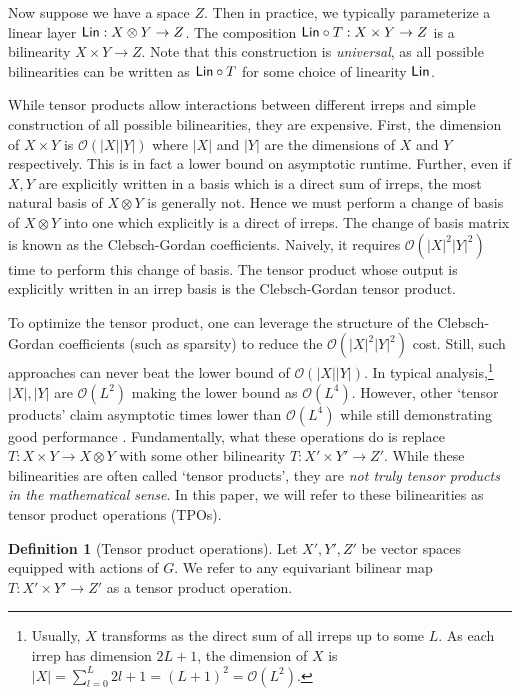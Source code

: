 \documentclass{article}
\theoremstyle{definition}
\newtheorem{definition}[theorem]{Definition}
\theoremstyle{remark}
\begin{document}
Now suppose we have a space $Z$. Then in practice, we typically parameterize a linear layer $\mathsf{Lin} :X\otimes Y\to Z$. The composition $\mathsf{Lin} \circ T:X\times Y\to Z$ is a bilinearity $X\times Y\to Z$. Note that this construction is \emph{universal}, as all possible bilinearities can be written as $\mathsf{Lin} \circ T$ for some choice of linearity $\mathsf{Lin}$.

While tensor products allow interactions between different irreps and simple construction of all possible bilinearities, they are expensive. First, the dimension of $X\times Y$ is $\mathcal{O}(|X||Y|)$ where $|X|$ and $|Y|$ are the dimensions of $X$ and $Y$ respectively. This is in fact a lower bound on asymptotic runtime. Further, even if $X,Y$ are explicitly written in a basis which is a direct sum of irreps, the most natural basis of $X\otimes Y$ is generally not. Hence we must perform a change of basis of $X\otimes Y$ into one which explicitly is a direct of irreps. The change of basis matrix is known as the Clebsch-Gordan coefficients. Naively, it requires $\mathcal{O}(|X|^2|Y|^2)$ time to perform this change of basis. The tensor product whose output is explicitly written in an irrep basis is the Clebsch-Gordan tensor product.

To optimize the tensor product, one can leverage the structure of the Clebsch-Gordan coefficients (such as sparsity) to reduce the $\mathcal{O}(|X|^2|Y|^2)$ cost. Still, such approaches can never beat the lower bound of $\mathcal{O}(|X||Y|)$. In typical analysis,\footnote{Usually, $X$ transforms as the direct sum of all irreps up to some $L$. As each irrep has dimension $2L + 1$, the dimension of $X$ is $|X| = \sum_{l = 0}^L 2l + 1 = (L + 1)^2 = \mathcal{O}(L^2)$.} $|X|, |Y|$ are $\mathcal{O}(L^2)$ making the lower bound as $\mathcal{O}(L^4)$. However, other `tensor products' claim asymptotic times lower than $\mathcal{O}(L^4)$ while still demonstrating good performance \citep{gaunt,unke2024e3x}. Fundamentally, what these operations do is replace $T:X\times Y\to X\otimes Y$ with some other bilinearity $T: X'\times Y'\to Z'$. While these bilinearities are often called `tensor products', they are \emph{not truly tensor products in the mathematical sense}. In this paper, we will refer to these bilinearities as tensor product operations (TPOs).
\begin{definition}[Tensor product operations]
    Let $X', Y', Z'$ be vector spaces equipped with actions of $G$. We refer to any equivariant bilinear map $T: X'\times Y'\to Z'$ as a tensor product operation.
\end{definition}
\end{document}
